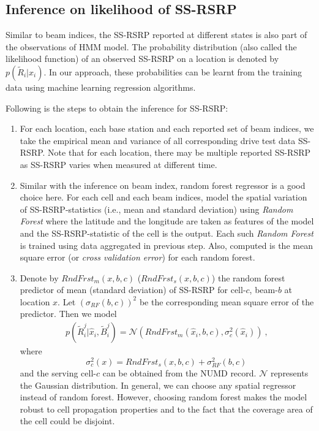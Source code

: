 \documentclass[conference, 10pt]{IEEEtran}
\begin{document}
\begin{NoHyper}
\subsection{Inference on likelihood of SS-RSRP}
\label{sec:prob-reg}
Similar to beam indices, the SS-RSRP reported at different states
is also part of the observations of HMM model. The probability
distribution (also called the likelihood function) of an observed SS-RSRP on a location is denoted by
$p(\tilde{R}_i|\hat{x}_{i})$. In our approach, these probabilities
can be learnt from the training data using machine learning regression algorithms. 

Following is the steps to obtain the inference for SS-RSRP:

\begin{enumerate}
\item For each location, each base station and each reported set of beam indices, we
take the empirical mean and variance of all corresponding drive test data SS-RSRP. Note that for each location, there may be multiple reported SS-RSRP as SS-RSRP varies when measured at different time.

\item Similar with the inference on beam index, random forest regressor is a good choice here. For each cell and each beam indices, model the spatial variation of SS-RSRP-statistics (i.e., mean and
standard deviation) using {\em Random Forest} where the latitude and the longitude are 
taken as features of the model and the SS-RSRP-statistic  of the cell is the output. Each such {\em
Random Forest} is trained using data aggregated in previous step. Also,
computed is the mean square error (or {\em cross validation error})
for each random forest. 

\item Denote by $RndFrst_m(x,b,c)$ ($RndFrst_s(x,b,c)$) the random forest predictor of
mean (standard deviation) of SS-RSRP for cell-$c$, beam-$b$
at location $x$. Let $(\sigma_{RF}(b,c))^2$ be the corresponding
mean square error of the predictor. Then we model
\begin{align}
p(\tilde{R}^j_i|\hat{x}_{i}, \tilde{B}^j_i) =
\mathcal{N}(RndFrst_m(\hat{x}_{i},b,c), \sigma_c^2(\hat{x}_i))\ ,
\label{eqn:rndfrst}
\end{align}
where $$\sigma_c^2(x) = RndFrst_s(x,b,c) + \sigma_{RF}^2(b,c)\,$$ 
and the serving cell-$c$ can be obtained from the NUMD record. $\mathcal{N}$ represents the Gaussian distribution.
In general, we
can choose any spatial regressor instead of random forest. However, choosing
random forest makes the model robust to cell propagation properties and to the
fact that the coverage area of the cell could be disjoint.
\end{enumerate}


\end{NoHyper}
\end{document}
